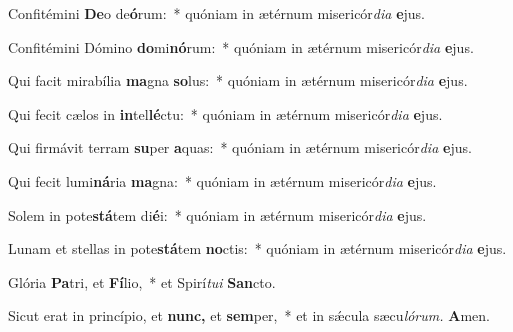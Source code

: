 \item Confitémini \textbf{De}o de\textbf{ó}rum:~* quóniam in ætérnum misericór\textit{dia} \textbf{e}jus.
\item Confitémini Dómino \textbf{do}mi\textbf{nó}rum:~* quóniam in ætérnum misericór\textit{dia} \textbf{e}jus.
\item Qui facit mirabília \textbf{ma}gna \textbf{so}lus:~* quóniam in ætérnum misericór\textit{dia} \textbf{e}jus.
\item Qui fecit cælos in \textbf{in}tel\textbf{lé}ctu:~* quóniam in ætérnum misericór\textit{dia} \textbf{e}jus.
\item Qui firmávit terram \textbf{su}per \textbf{a}quas:~* quóniam in ætérnum misericór\textit{dia} \textbf{e}jus.
\item Qui fecit lumi\textbf{ná}ria \textbf{ma}gna:~* quóniam in ætérnum misericór\textit{dia} \textbf{e}jus.
\item Solem in pote\textbf{stá}tem di\textbf{é}i:~* quóniam in ætérnum misericór\textit{dia} \textbf{e}jus.
\item Lunam et stellas in pote\textbf{stá}tem \textbf{no}ctis:~* quóniam in ætérnum misericór\textit{dia} \textbf{e}jus.
\item Glória \textbf{Pa}tri, et \textbf{Fí}lio,~* et Spirí\tinyhspace\textit{tui} \textbf{San}cto.
\item Sicut erat in princípio, et \textbf{nunc,} et \textbf{sem}per,~* et in sǽcula sæcu\tinyhspace\textit{lórum.} \textbf{A}men.